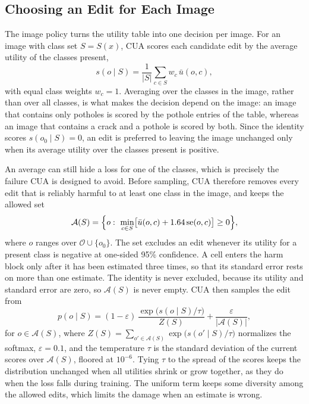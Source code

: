 \documentclass[conference]{IEEEtran}
\begin{document}
\subsection{Choosing an Edit for Each Image}
\label{sec:method_policy}

The image policy turns the utility table into one decision per image. For an image with class set $S=S(x)$, CUA scores each candidate edit by the average utility of the classes present,
\begin{equation}
s(o\mid S)=\frac{1}{|S|}\sum_{c\in S}w_c\,\bar u(o,c),
\label{eq:score}
\end{equation}
with equal class weights $w_c=1$. Averaging over the classes in the image, rather than over all classes, is what makes the decision depend on the image: an image that contains only potholes is scored by the pothole entries of the table, whereas an image that contains a crack and a pothole is scored by both. Since the identity scores $s(o_0\mid S)=0$, an edit is preferred to leaving the image unchanged only when its average utility over the classes present is positive.

An average can still hide a loss for one of the classes, which is precisely the failure CUA is designed to avoid. Before sampling, CUA therefore removes every edit that is reliably harmful to at least one class in the image, and keeps the allowed set
\begin{equation}
\mathcal{A}(S)=\Bigl\{o:\ \min_{c\in S}\bigl[\bar u(o,c)+1.64\,\mathrm{se}(o,c)\bigr]\geq 0\Bigr\},
\label{eq:harm}
\end{equation}
where $o$ ranges over $\mathcal{O}\cup\{o_0\}$. The set excludes an edit whenever its utility for a present class is negative at one-sided 95\% confidence. A cell enters the harm block only after it has been estimated three times, so that its standard error rests on more than one estimate. The identity is never excluded, because its utility and standard error are zero, so $\mathcal{A}(S)$ is never empty. CUA then samples the edit from
\begin{equation}
p(o\mid S)=(1-\varepsilon)\,\frac{\exp\bigl(s(o\mid S)/\tau\bigr)}{Z(S)}+\frac{\varepsilon}{|\mathcal{A}(S)|},
\label{eq:sampling}
\end{equation}
for $o\in\mathcal{A}(S)$, where $Z(S)=\sum_{o'\in\mathcal{A}(S)}\exp\bigl(s(o'\mid S)/\tau\bigr)$ normalizes the softmax, $\varepsilon=0.1$, and the temperature $\tau$ is the standard deviation of the current scores over $\mathcal{A}(S)$, floored at $10^{-6}$. Tying $\tau$ to the spread of the scores keeps the distribution unchanged when all utilities shrink or grow together, as they do when the loss falls during training. The uniform term keeps some diversity among the allowed edits, which limits the damage when an estimate is wrong.
\end{document}
